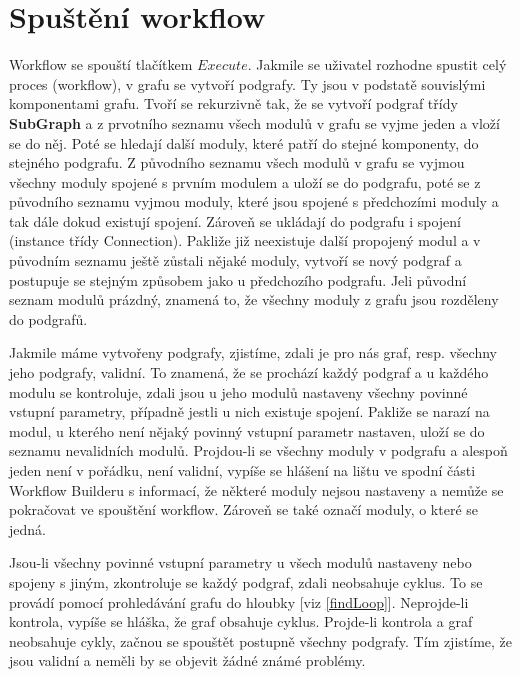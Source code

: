 \newpage
\section{Spuštění workflow}
\nocite{demel:book}
Workflow se spouští tlačítkem $Execute$. Jakmile se uživatel rozhodne spustit celý proces (workflow), v grafu se vytvoří podgrafy. Ty jsou v podstatě souvislými komponentami grafu. Tvoří se rekurzivně tak, že se vytvoří podgraf třídy \textbf{SubGraph} a z prvotního seznamu všech modulů v grafu se vyjme jeden a vloží se do něj. Poté se hledají další moduly, které patří do stejné komponenty, do stejného podgrafu. Z původního seznamu všech modulů v grafu se vyjmou všechny moduly spojené s prvním modulem a uloží se do podgrafu, poté se z původního seznamu vyjmou moduly, které jsou spojené s předchozími moduly a tak dále dokud existují spojení. Zároveň se ukládají do podgrafu i spojení (instance třídy Connection). Pakliže již neexistuje další propojený modul a v původním seznamu ještě zůstali nějaké moduly, vytvoří se nový podgraf a postupuje se stejným způsobem jako u předchozího podgrafu. Jeli původní seznam modulů prázdný, znamená to, že všechny moduly z grafu jsou rozděleny do podgrafů.

Jakmile máme vytvořeny podgrafy, zjistíme, zdali je pro nás graf, resp. všechny jeho podgrafy, validní. To znamená, že se prochází každý podgraf a u každého modulu se kontroluje, zdali jsou u jeho modulů nastaveny všechny povinné vstupní parametry, případně jestli u nich existuje spojení. Pakliže se narazí na modul, u kterého není nějaký povinný vstupní parametr nastaven, uloží se do seznamu nevalidních modulů. Projdou-li se všechny moduly v podgrafu a alespoň jeden není v pořádku, není validní, vypíše se hlášení na lištu ve spodní části Workflow Builderu s informací, že některé moduly nejsou nastaveny a nemůže se pokračovat ve spouštění workflow. Zároveň se také označí moduly, o které se jedná.

Jsou-li všechny povinné vstupní parametry u všech modulů nastaveny nebo spojeny s jiným, zkontroluje se každý podgraf, zdali neobsahuje cyklus. To se provádí pomocí prohledávání grafu do hloubky [viz \lstlistingname \ref{findLoop}]. Neprojde-li kontrola, vypíše se hláška, že graf obsahuje cyklus. Projde-li kontrola a graf neobsahuje cykly, začnou se spouštět postupně všechny podgrafy. Tím zjistíme, že jsou validní a neměli by se objevit žádné známé problémy. 


